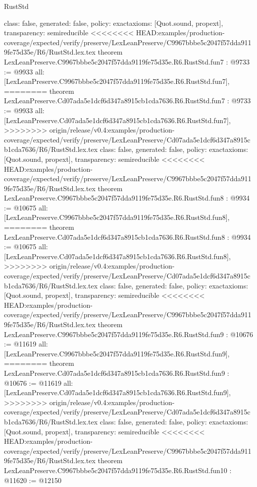 \begin{lexlean}{RustStd}
\begin{coremodule}
{\begin{coremodule}
{{{{{{{{{{  class: false,
  generated: false,
  policy: exact{axioms: [Quot.sound, propext]},
  transparency: semireducible
}
<<<<<<<< HEAD:examples/production-coverage/expected/verify/preserve/LexLeanPreserve/C9967bbbe5c2047f57dda9119fe75d35e/R6/RustStd.lex.tex
theorem LexLeanPreserve.C9967bbbe5c2047f57dda9119fe75d35e.R6.RustStd.fun7 : @9733 := @9933 {
  all: [LexLeanPreserve.C9967bbbe5c2047f57dda9119fe75d35e.R6.RustStd.fun7],
========
theorem LexLeanPreserve.Cd07ada5e1dcf6d347a8915cb1cda7636.R6.RustStd.fun7 : @9733 := @9933 {
  all: [LexLeanPreserve.Cd07ada5e1dcf6d347a8915cb1cda7636.R6.RustStd.fun7],
>>>>>>>> origin/release/v0.4:examples/production-coverage/expected/verify/preserve/LexLeanPreserve/Cd07ada5e1dcf6d347a8915cb1cda7636/R6/RustStd.lex.tex
  class: false,
  generated: false,
  policy: exact{axioms: [Quot.sound, propext]},
  transparency: semireducible
}
<<<<<<<< HEAD:examples/production-coverage/expected/verify/preserve/LexLeanPreserve/C9967bbbe5c2047f57dda9119fe75d35e/R6/RustStd.lex.tex
theorem LexLeanPreserve.C9967bbbe5c2047f57dda9119fe75d35e.R6.RustStd.fun8 : @9934 := @10675 {
  all: [LexLeanPreserve.C9967bbbe5c2047f57dda9119fe75d35e.R6.RustStd.fun8],
========
theorem LexLeanPreserve.Cd07ada5e1dcf6d347a8915cb1cda7636.R6.RustStd.fun8 : @9934 := @10675 {
  all: [LexLeanPreserve.Cd07ada5e1dcf6d347a8915cb1cda7636.R6.RustStd.fun8],
>>>>>>>> origin/release/v0.4:examples/production-coverage/expected/verify/preserve/LexLeanPreserve/Cd07ada5e1dcf6d347a8915cb1cda7636/R6/RustStd.lex.tex
  class: false,
  generated: false,
  policy: exact{axioms: [Quot.sound, propext]},
  transparency: semireducible
}
<<<<<<<< HEAD:examples/production-coverage/expected/verify/preserve/LexLeanPreserve/C9967bbbe5c2047f57dda9119fe75d35e/R6/RustStd.lex.tex
theorem LexLeanPreserve.C9967bbbe5c2047f57dda9119fe75d35e.R6.RustStd.fun9 : @10676 := @11619 {
  all: [LexLeanPreserve.C9967bbbe5c2047f57dda9119fe75d35e.R6.RustStd.fun9],
========
theorem LexLeanPreserve.Cd07ada5e1dcf6d347a8915cb1cda7636.R6.RustStd.fun9 : @10676 := @11619 {
  all: [LexLeanPreserve.Cd07ada5e1dcf6d347a8915cb1cda7636.R6.RustStd.fun9],
>>>>>>>> origin/release/v0.4:examples/production-coverage/expected/verify/preserve/LexLeanPreserve/Cd07ada5e1dcf6d347a8915cb1cda7636/R6/RustStd.lex.tex
  class: false,
  generated: false,
  policy: exact{axioms: [Quot.sound, propext]},
  transparency: semireducible
}
<<<<<<<< HEAD:examples/production-coverage/expected/verify/preserve/LexLeanPreserve/C9967bbbe5c2047f57dda9119fe75d35e/R6/RustStd.lex.tex
theorem LexLeanPreserve.C9967bbbe5c2047f57dda9119fe75d35e.R6.RustStd.fun10 : @11620 := @12150 {
}}}}}}}}}}}}}
\end{coremodule}}
\end{coremodule}
\end{lexlean}
